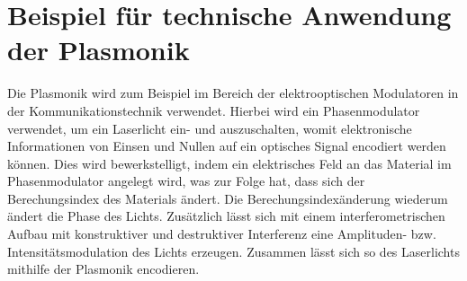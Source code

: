 
\section{Beispiel für technische Anwendung der Plasmonik}

Die Plasmonik wird zum Beispiel im Bereich der elektrooptischen Modulatoren in der Kommunikationstechnik verwendet. Hierbei wird ein Phasenmodulator verwendet, um ein Laserlicht ein- und auszuschalten, womit elektronische Informationen von Einsen und Nullen auf ein optisches Signal encodiert werden können. Dies wird bewerkstelligt, indem ein elektrisches Feld an das Material im Phasenmodulator angelegt wird, was zur Folge hat, dass sich der Berechungsindex des Materials ändert. Die Berechungsindexänderung wiederum ändert die Phase des Lichts. Zusätzlich lässt sich mit einem interferometrischen Aufbau mit konstruktiver und destruktiver Interferenz eine Amplituden- bzw. Intensitätsmodulation des Lichts erzeugen. Zusammen lässt sich so des Laserlichts mithilfe der Plasmonik encodieren. \cite{Anwendung} 